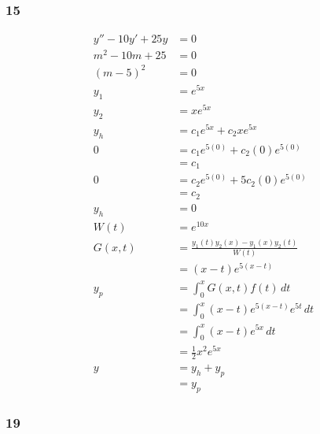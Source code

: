 \documentclass{article}
\begin{document}
\subsubsection{15}

\begin{align*}
  y'' - 10y' + 25y & = 0                                            \\
  m^2 - 10m + 25   & = 0                                            \\
  (m - 5)^2        & = 0                                            \\
  y_1              & = e^{5x}                                       \\
  y_2              & = x e^{5x}                                     \\
  y_h              & = c_1 e^{5x} + c_2 x e^{5x}                    \\
  0                & = c_1 e^{5 (0)} + c_2 (0) e^{5 (0)}            \\
                   & = c_1                                          \\
  0                & = c_2 e^{5 (0)} + 5 c_2 (0) e^{5 (0)}          \\
                   & = c_2                                          \\
  y_h              & = 0                                            \\
  W(t)             & = e^{10x}                                      \\
  G(x, t)          & = \frac{y_1(t) y_2(x) - y_1(x) y_2(t)}{W(t)}   \\
                   & = (x - t) e^{5 (x - t)}                        \\
  y_p              & = \int_{0}^x G(x, t) f(t) \,dt                 \\
                   & = \int_{0}^x (x - t) e^{5 (x - t)} e^{5t} \,dt \\
                   & = \int_{0}^x (x - t) e^{5x} \,dt               \\
                   & = \frac{1}{2} x^2 e^{5x}                       \\
  y                & = y_h + y_p                                    \\
                   & = y_p
\end{align*}

\subsubsection{19}
\end{document}
